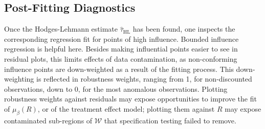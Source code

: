 \subsection{Post-Fitting Diagnostics} \label{sec:post-fitt-diagn}
Once the Hodges-Lehmann estimate $\hat{\tau}_{\mathrm{HL}}$ has been found, one
inspects the corresponding regression fit for points of high influence.
Bounded influence regression is helpful here.  Besides making
influential points easier to see in residual plots, this limits
effects of data contamination, as non-conforming influence points are
down-weighted as a result of the fitting process. This down-weighting
is reflected in robustness weights, ranging from 1, for non-discounted
observations, down to 0, for the most anomalous observations.
Plotting %
robustness weights against residuals may expose opportunities to
improve the fit of $\mu_{\beta}(R)$, or of the treatment effect model;
plotting them against $R$ may expose contaminated sub-regions
of $\mathcal{W}$ that specification testing failed to remove.



